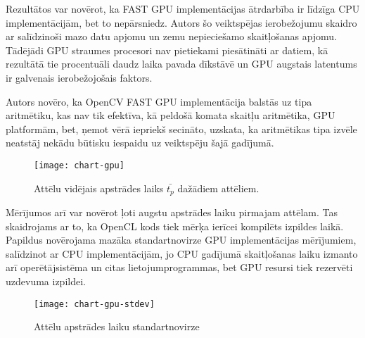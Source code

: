 Rezultātos var novērot, ka FAST GPU implementācijas ātrdarbība ir līdzīga
CPU implementācijām, bet to nepārsniedz. Autors šo veiktspējas
ierobežojumu skaidro ar salīdzinoši mazo datu apjomu un
zemu nepieciešamo skaitļošanas apjomu. Tādējādi GPU straumes
procesori nav pietiekami piesātināti ar datiem, kā rezultātā tie
procentuāli daudz laika pavada dīkstāvē un
GPU augstais latentums ir galvenais ierobežojošais faktors.

Autors novēro, ka OpenCV FAST GPU implementācija balstās uz
 tipa aritmētiku, kas nav tik efektīva, kā
peldošā komata skaitļu aritmētika, GPU platformām, bet, ņemot vērā
iepriekš secināto, uzskata, ka aritmētikas tipa izvēle neatstāj nekādu
būtisku iespaidu uz veiktspēju šajā gadījumā.

\begin{figure}[t]
	\centering
	\texttt{[image: chart-gpu]}
	\caption{Attēlu vidējais apstrādes laiks $\bar{t_p}$ dažādiem attēliem.}
	\label{fig:test2-data}
\end{figure}
Mērījumos arī var novērot ļoti augstu apstrādes laiku pirmajam attēlam. Tas
skaidrojams ar to, ka OpenCL kods tiek mērķa ierīcei kompilēts izpildes
laikā. 
Papildus novērojama mazāka standartnovirze GPU implementācijas mērījumiem,
salīdzinot ar CPU implementācijām, jo CPU gadījumā skaitļošanas laiku
izmanto arī operētājsistēma un citas lietojumprogrammas, bet GPU resursi
tiek rezervēti uzdevuma izpildei.
\begin{figure}[bh]
	\centering
	\texttt{[image: chart-gpu-stdev]}
	\caption{Attēlu apstrādes laiku standartnovirze}
	\label{fig:test2-stdev}
\end{figure}
